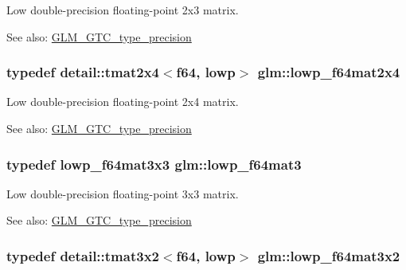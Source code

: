 Low double-precision floating-point 2x3 matrix. \begin{Desc}
\item[See also:]\hyperlink{group__gtc__type__precision}{GLM\_\-GTC\_\-type\_\-precision} \end{Desc}
\hypertarget{group__gtc__type__precision_g38366c50f2a2755c49110c7fc1441683}{
\subsubsection[lowp\_\-f64mat2x4]{\setlength{\rightskip}{0pt plus 5cm}typedef detail::tmat2x4$<$f64, lowp$>$ {\bf glm::lowp\_\-f64mat2x4}}}
\label{group__gtc__type__precision_g38366c50f2a2755c49110c7fc1441683}


Low double-precision floating-point 2x4 matrix. \begin{Desc}
\item[See also:]\hyperlink{group__gtc__type__precision}{GLM\_\-GTC\_\-type\_\-precision} \end{Desc}
\hypertarget{group__gtc__type__precision_g4acbda53fb7ff9568c0a2786fad450b8}{
\subsubsection[lowp\_\-f64mat3]{\setlength{\rightskip}{0pt plus 5cm}typedef lowp\_\-f64mat3x3 {\bf glm::lowp\_\-f64mat3}}}
\label{group__gtc__type__precision_g4acbda53fb7ff9568c0a2786fad450b8}


Low double-precision floating-point 3x3 matrix. \begin{Desc}
\item[See also:]\hyperlink{group__gtc__type__precision}{GLM\_\-GTC\_\-type\_\-precision} \end{Desc}
\hypertarget{group__gtc__type__precision_g99f6455a37a4c407a26981561184c76d}{
\subsubsection[lowp\_\-f64mat3x2]{\setlength{\rightskip}{0pt plus 5cm}typedef detail::tmat3x2$<$f64, lowp$>$ {\bf glm::lowp\_\-f64mat3x2}}}
\label{group__gtc__type__precision_g99f6455a37a4c407a26981561184c76d}


